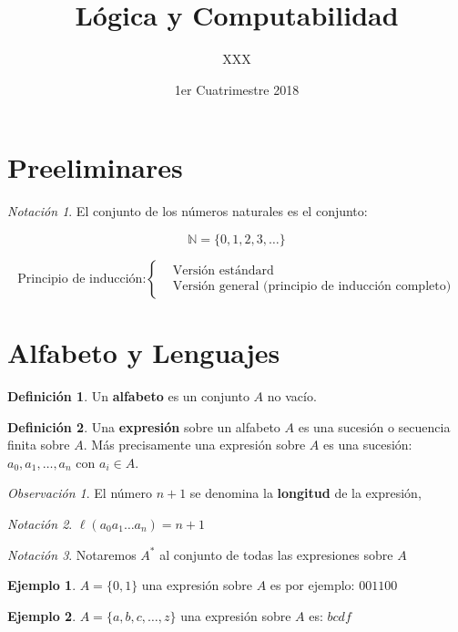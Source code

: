 \documentclass[a4paper,11pt]{article}
\title{Lógica y Computabilidad}
\author{XXX}
\date{1er Cuatrimestre 2018}
\theoremstyle{definition}
\newtheorem{defn}{Definición}[section]
\newtheorem{exap}{Ejemplo}[section]
\theoremstyle{remark}
\newtheorem*{remk}{Observación}
\newtheorem*{notc}{Notación}
\begin{document}
\maketitle

\section{Preeliminares}

\begin{notc}
El conjunto de los números naturales es el conjunto:

\[\mathbb N = \{ 0, 1, 2, 3, \dots \}\]
\end{notc}

\[
\text{Principio de inducción:}
\begin{cases}
&\text{Versión estándard} \\
&\text{Versión general (principio de inducción completo)}
\end{cases}
\]

\section{Alfabeto y Lenguajes}

\begin{defn}
Un \textbf{alfabeto} es un conjunto $A$ no vacío.
\end{defn}

\begin{defn}
Una \textbf{expresión} sobre un alfabeto $A$ es una sucesión o
secuencia finita sobre $A$. Más precisamente una expresión sobre $A$ es
una sucesión: $a_0, a_1, \dots, a_n$ con $a_i \in A$.
\end{defn}

\begin{remk}
El número $n+1$ se denomina la \textbf{longitud} de la expresión,
\end{remk}

\begin{notc}
$\ell(a_0a_1\dots a_n) = n+1$
\end{notc}

\begin{notc}
Notaremos $A^*$ al conjunto de todas las expresiones sobre $A$
\end{notc}

\begin{exap}
$A = \{0, 1\}$ una expresión sobre $A$ es por ejemplo: $001100$
\end{exap}

\begin{exap}
$A = \{a, b, c, \dots, z\}$ una expresión sobre $A$ es: $bcdf$
\end{exap}
\end{document}
